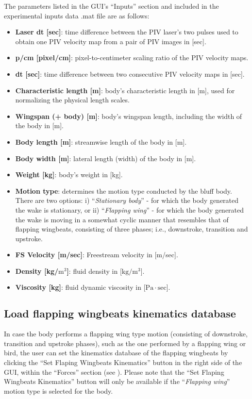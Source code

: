 \documentclass[12pt,a4paper]{article}
\begin{document}
\newpage
The parameters listed in the GUI's ``Inputs'' section and included in the experimental inputs data .mat file are as follows:
\begin{itemize}
	\item \textbf{Laser dt [sec]}: time difference between the PIV laser's two pulses used to obtain one PIV velocity map from a pair of PIV images in [sec]. 
	\item \textbf{p/cm [pixel/cm]}: pixel-to-centimeter scaling ratio of the PIV velocity maps.
	\item \textbf{dt [sec]}: time difference between two consecutive PIV velocity maps in [sec].
	\item \textbf{Characteristic length [m]}: body's characteristic length in [m], used for normalizing the physical length scales.
	\item \textbf{Wingspan (+ body) [m]}: body's wingspan length, including the width of the body in [m].
	\item \textbf{Body length [m]}: streamwise length of the body in [m].
	\item \textbf{Body width [m]}: lateral length (width) of the body in [m].
	\item \textbf{Weight [kg]}: body's weight in [kg].
	\item \textbf{Motion type}: determines the motion type conducted by the bluff body. There are two options: i) ``\textit{Stationary body}'' - for which the body generated the wake is stationary, or ii) ``\textit{Flapping wing}'' - for which the body generated the wake is moving in a somewhat cyclic manner that resembles that of flapping wingbeats, consisting of three phases; i.e., downstroke, transition and upstroke.
	\item \textbf{FS Velocity [m/sec]}: Freestream velocity in [m/sec].
	\item \textbf{Density [kg/$\mathrm{m^3}$]}: fluid density in [$\mathrm{kg/m^3}$].
	\item \textbf{Viscosity [kg]}: fluid dynamic viscosity in [$\mathrm{Pa\cdot sec}$].
\end{itemize}


\newpage
\subsection{Load flapping wingbeats kinematics database}\label{KIN-DB}

In case the body performs a flapping wing type motion (consisting of downstroke, transition and upstroke phases), such as the one performed by a flapping wing or bird, the user can set the kinematics database of the flapping wingbeats by clicking the ``Set Flaping Wingbeats Kinematics'' button in the right side of the GUI, within the ``Forces'' section (see ). Please note that the ``Set Flaping Wingbeats Kinematics'' button will only be available if the ``\textit{Flapping wing}'' motion type is selected for the body.
\end{document}
